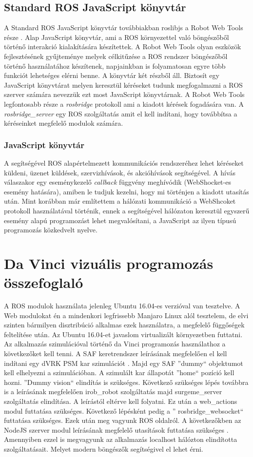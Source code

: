 \documentclass[12pt,a4paper,oneside]{report} %
\begin{document}
\subsection{Standard ROS JavaScript könyvtár}
\label{roslibjs}
A Standard ROS JavaScript könyvtár továbbiakban roslibjs a Robot Web Tools része \cite{toris2015robot}.  Alap JavaScript könyvtár, ami a ROS környezettel való böngészőből történő interakció kialakítására készítettek. A Robot Web Tools olyan eszközök fejlesztésének gyűjteménye melyek célkitűzése a ROS rendszer böngészőből történő használatához készítenek, napjainkban is folyamatosan egyre több funkciót lehetséges elérni benne. A könyvtár két részből áll. Biztosít egy JavaScript könyvtárat melyen keresztül kéréseket tudunk megfogalmazni a ROS szerver számára nevezzük ezt most JavaScript könyvtárnak. A Robot Web Tools legfontosabb része a \textit{rosbridge} protokoll ami a kiadott kérések fogadására van. A \textit{rosbridge\_server} egy ROS szolgáltatás amit el kell indítani, hogy továbbítsa a kéréseinket megfelelő modulok számára.
\subsubsection{JavaScript könyvtár}  A segítségével ROS alapértelmezett kommunikációs rendszeréhez lehet kéréseket küldeni, üzenet küldések, szervizhívások, és akcióhívások segítségével. A hívás válaszakor egy eseménykezelő \textit{callback} függvény meghívódik (WebShocket-es esemény hatására), amiben le tudjuk kezelni, hogy mi történjen a kiadott utasítás után. Mint korábban már említettem a hálózati kommunikáció a WebShcoket protokoll \cite{fette2011websocket} használatával történik, ennek a segítségével hálózaton keresztül egyszerű esemény alapú programozást lehet megvalósítani, a JavaScript az ilyen típusú programozás közkedvelt nyelve.
\section{Da Vinci vizuális programozás összefoglaló}
A ROS modulok használata jelenleg Ubuntu 16.04-es verzióval van tesztelve. A Web modulokat én a mindenkori legfrissebb Manjaro Linux alól tesztelem, de elvi szinten bármilyen disztribúció alkalmas ezek használatra, a megfelelő függőségek feltelítése után. Az Ubuntu 16.04-et javaslom virtualizált környezetben futtatni.
Az alkalmazás szimulációval történő  da Vinci programozás használathoz a következőket kell tenni. A SAF keretrendszer leírásának megfelelően  el kell indítani egy dVRK PSM kar szimulációt \cite{irobotics2020May}. Majd egy SAF ''dummy`` objektumot kell elhelyezni a szimulációban. A szimulált kar állapotát ''home`` pozíció kell hozni. ''Dummy vision`` elindítás is szükséges. Következő szükséges lépés továbbra is a leírásának megfelelően irob\_robot szolgáltatás majd surgeme\_server szolgáltatás elindítása. A leírástól eltérve kell folyatni. Ez után a web\_actions modul futtatása szükséges. Következő lépésként pedig a '' rosbridge\_websocket`` futtatása szükséges. Ezek után meg vagyunk ROS oldalról. A következőkben az NodeJS szerver modul leírásának megfelelő utasítások futtatása szükséges \cite{aaronrancsik2020May}. Amennyiben ezzel is megvagyunk az alkalmazás localhost hálózton elindította szolgáltatásait. Melyet modern böngészők segítségivel el lehet érni.
\end{document}
